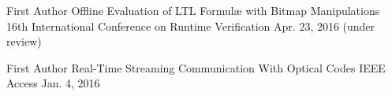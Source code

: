 


\begin{cventries}

  \cventry
    {First Author} %
    {Offline Evaluation of LTL Formul\ae{} with Bitmap Manipulations} %
    {16th International Conference on Runtime Verification} %
    {Apr. 23, 2016 (under review)} %
    {}

  \cventry
    {First Author} %
    {Real-Time Streaming Communication With Optical Codes} %
    {IEEE Access} %
    {Jan. 4, 2016} %
    {
    }

\end{cventries}

